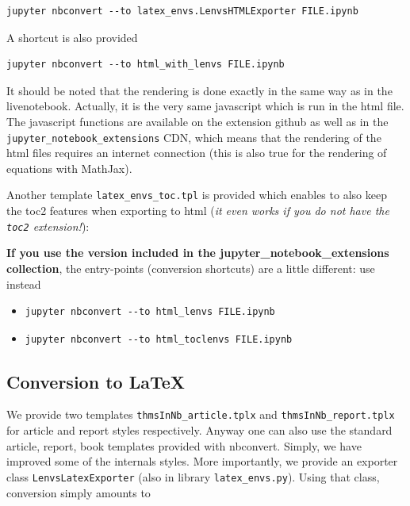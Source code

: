 \begin{verbatim}
jupyter nbconvert --to latex_envs.LenvsHTMLExporter FILE.ipynb
\end{verbatim}

A shortcut is also provided

\begin{verbatim}
jupyter nbconvert --to html_with_lenvs FILE.ipynb
\end{verbatim}

It should be noted that the rendering is done exactly in the same way as
in the livenotebook. Actually, it is the very same javascript which is
run in the html file. The javascript functions are available on the
extension github as well as in the
\texttt{jupyter\_notebook\_extensions} CDN, which means that the
rendering of the html files requires an internet connection (this is
also true for the rendering of equations with MathJax).

Another template \texttt{latex\_envs\_toc.tpl} is provided which enables
to also keep the toc2 features when exporting to html (\emph{it even
works if you do not have the \texttt{toc2} extension!}):

\begin{Shaded}
\begin{Highlighting}[]
 
\end{Highlighting}
\end{Shaded}

\textbf{If you use the version included in the
jupyter\_notebook\_extensions collection}, the entry-points (conversion
shortcuts) are a little different: use instead

\begin{itemize}
\item
\begin{verbatim}
jupyter nbconvert --to html_lenvs FILE.ipynb
\end{verbatim}
\item
\begin{verbatim}
jupyter nbconvert --to html_toclenvs FILE.ipynb
\end{verbatim}
\end{itemize}

\subsection{Conversion to LaTeX}\label{conversion-to-latex}

We provide two templates \texttt{thmsInNb\_article.tplx} and
\texttt{thmsInNb\_report.tplx} for article and report styles
respectively. Anyway one can also use the standard article, report, book
templates provided with nbconvert. Simply, we have improved some of the
internals styles. More importantly, we provide an exporter class
\texttt{LenvsLatexExporter} (also in library \texttt{latex\_envs.py}).
Using that class, conversion simply amounts to

